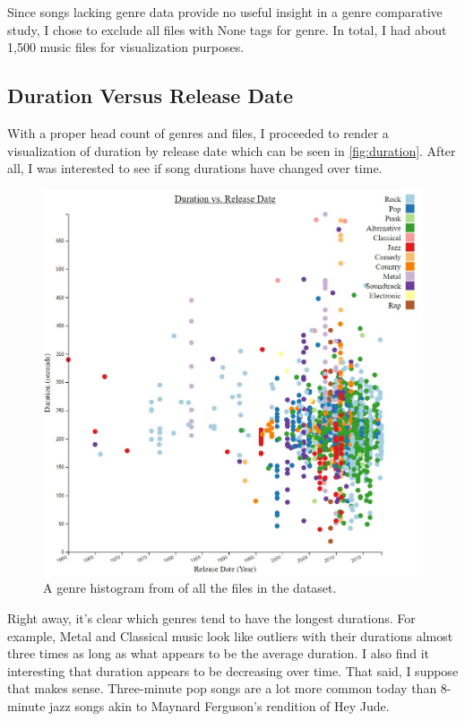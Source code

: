 \documentclass[journal]{vgtc}                %
\begin{document}
Since songs lacking genre data provide no useful insight in a genre comparative
study, I chose to exclude all files with None tags for genre. In total, I had
about 1,500 music files for visualization purposes.

\subsection{Duration Versus Release Date}

With a proper head count of genres and files, I proceeded to render a
visualization of duration by release date which can be seen in
\autoref{fig:duration}. After all, I was interested to see if song durations
have changed over time.

\begin{figure}[h]
 \centering %
 \includegraphics[width=\columnwidth]{duration-vs-release-date}
 \caption{A genre histogram from \cite{Grifski:2019} of all the files in the dataset.}
 \label{fig:duration}
\end{figure}

Right away, it's clear which genres tend to have the longest durations. For
example, Metal and Classical music look like outliers with their durations
almost three times as long as what appears to be the average duration. I also
find it interesting that duration appears to be decreasing over time.
That said, I suppose that makes sense. Three-minute pop songs are a lot more
common today than 8-minute jazz songs akin to Maynard Ferguson's rendition
of Hey Jude.
\end{document}
